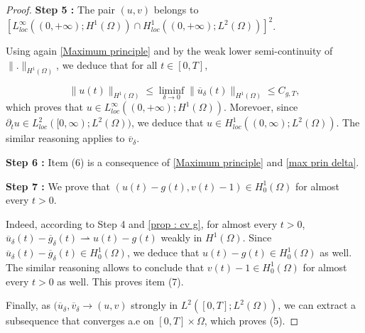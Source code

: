 \documentclass[reqno,12pt,twoside]{amsart}
\numberwithin{equation}{section} \numberwithin{theorem}{section}
\numberwithin{proposition}{section} \numberwithin{lemma}{section}
\numberwithin{corollary}{section}
\numberwithin{definition}{section} \numberwithin{remark}{section}
\begin{document}
\begin{proof}
\smallskip

\textbf{Step 5 :} The pair $(u, v)$ belongs to $[L^\infty_{loc}((0,+\infty); H^1(\Omega))\cap H^1_{loc}((0,+\infty) ; L^2(\Omega))]^2$. 

\smallskip

Using again \autoref{Maximum principle} and by the weak lower semi-continuity of $\|.\|_{H^1(\Omega)}$, we deduce that for all $t\in [0,T]$,

\[\|u(t)\|_{H^1(\Omega)} \leqslant \liminf\limits_{\delta\rightarrow 0} \|\overline{u}_\delta (t)\|_{H^1(\Omega)} \leqslant C_{g,T},\]
which proves that $u\in L_{loc}^\infty((0,+\infty); H^1(\Omega))$. Morevoer, since $\partial_t u \in L_{loc}^2([0,\infty);L^2(\Omega))$, we deduce that $u\in H^1_{loc}((0,\infty); L^2(\Omega))$.  
The similar reasoning applies to $\overline{v}_\delta$.  

\smallskip

\textbf{Step 6 :} Item (6) is a consequence of \autoref{Maximum principle} and \eqref{max prin delta}.


\textbf{Step 7 :} We prove that $(u(t) - g(t), v(t)-1) \in H_0^1(\Omega)$ for almost every $t >0$. 

\smallskip

Indeed, according to Step 4 and \autoref{prop : cv g}, for almost every $t >0$, $\overline{u}_\delta (t) - \overline{g}_\delta (t) \rightharpoonup u(t) -g(t)$ weakly in $H^1(\Omega)$. Since $\overline{u}_\delta (t) - \overline{g}_\delta (t) \in H_0^1(\Omega)$, we deduce that $u(t) -g(t) \in H_0^1(\Omega)$ as well. The similar reasoning allows to conclude that $v(t) - 1\in H_0^1(\Omega)$ for almost every $t >0$ as well. This proves item (7). 


Finally, as $(\overline{u}_\delta, \overline{v}_\delta \rightarrow (u,v)$ strongly in $L^2([0,T];L^2(\Omega))$, we can extract a subsequence that converges a.e on $[0,T]\times \Omega$, which proves (5).
\end{proof}
\end{document}
